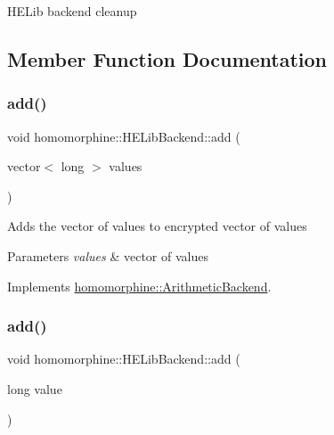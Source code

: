 H\+E\+Lib backend cleanup 

\subsection{Member Function Documentation}
\mbox{\label{classhomomorphine_1_1_h_e_lib_backend_a1e3c4745d7efdaac1f75c5a7fbfc3707}} 
\subsubsection{\texorpdfstring{add()}{add()}\hspace{0.1cm}{\footnotesize\ttfamily [1/2]}}
{\footnotesize\ttfamily void homomorphine\+::\+H\+E\+Lib\+Backend\+::add (\begin{DoxyParamCaption}\item[{vector$<$ long $>$}]{values }\end{DoxyParamCaption})\hspace{0.3cm}{\ttfamily [virtual]}}

Adds the vector of values to encrypted vector of values


\begin{DoxyParams}{Parameters}
{\em values} & vector of values \\
\hline
\end{DoxyParams}


Implements \mbox{\hyperlink{classhomomorphine_1_1_arithmetic_backend_abf4053e05f07e566e9563a75f516daf6}{homomorphine\+::\+Arithmetic\+Backend}}.

\mbox{\label{classhomomorphine_1_1_h_e_lib_backend_a6cc00dcfc209206e67c7237934cb8d82}} 
\subsubsection{\texorpdfstring{add()}{add()}\hspace{0.1cm}{\footnotesize\ttfamily [2/2]}}
{\footnotesize\ttfamily void homomorphine\+::\+H\+E\+Lib\+Backend\+::add (\begin{DoxyParamCaption}\item[{long}]{value }\end{DoxyParamCaption})\hspace{0.3cm}{\ttfamily [virtual]}}

